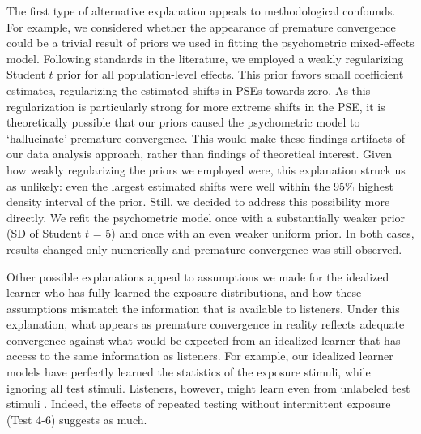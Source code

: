 \documentclass[
  11pt,
  man,mask,floatsintext]{apa6}
\begin{document}
The first type of alternative explanation appeals to methodological confounds. For example, we considered whether the appearance of premature convergence could be a trivial result of priors we used in fitting the psychometric mixed-effects model. Following standards in the literature, we employed a weakly regularizing Student \(t\) prior for all population-level effects. This prior favors small coefficient estimates, regularizing the estimated shifts in PSEs towards zero. As this regularization is particularly strong for more extreme shifts in the PSE, it is theoretically possible that our priors caused the psychometric model to `hallucinate' premature convergence. This would make these findings artifacts of our data analysis approach, rather than findings of theoretical interest. Given how weakly regularizing the priors we employed were, this explanation struck us as unlikely: even the largest estimated shifts were well within the 95\% highest density interval of the prior. Still, we decided to address this possibility more directly. We refit the psychometric model once with a substantially weaker prior (SD of Student \(t\) = 5) and once with an even weaker uniform prior. In both cases, results changed only numerically and premature convergence was still observed.

Other possible explanations appeal to assumptions we made for the idealized learner who has fully learned the exposure distributions, and how these assumptions mismatch the information that is available to listeners. Under this explanation, what appears as premature convergence in reality reflects adequate convergence against what would be expected from an idealized learner that has access to the same information as listeners. For example, our idealized learner models have perfectly learned the statistics of the exposure stimuli, while ignoring all test stimuli. Listeners, however, might learn even from unlabeled test stimuli \autocite[for demonstration, see][]{xie-kurumada2024}. Indeed, the effects of repeated testing without intermittent exposure (Test 4-6) suggests as much.
\end{document}
